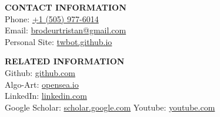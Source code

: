 



\begin{multicols}{3}
{\bf CONTACT INFORMATION}\\ 
Phone: \href{tel:15059776014}{+1 (505) 977-6014} \\
Email: \href{mailto:brodeurtristan@gmail.com}{brodeurtristan@gmail.com} \\
Personal Site: \href{https://twbot.github.io/}{twbot.github.io}

\columnbreak

\hfill

\columnbreak

{\bf RELATED INFORMATION} \\
Github: \href{https://github.com/twbot}{github.com}\\
Algo-Art: \href{https://opensea.io/twbot}{{opensea.io}} \\
LinkedIn: \href{https://www.linkedin.com/in/tristan-brodeur-a7987896/}{{linkedin.com}}\\
Google Scholar: \href{https://scholar.google.com/citations?user=fJzDPGsAAAAJ&hl=en}{{scholar.google.com}}
Youtube: \href{https://www.youtube.com/channel/UCz8wuoaz3aeBIAW6Z7z89vg}{{youtube.com}}
\end{multicols}

